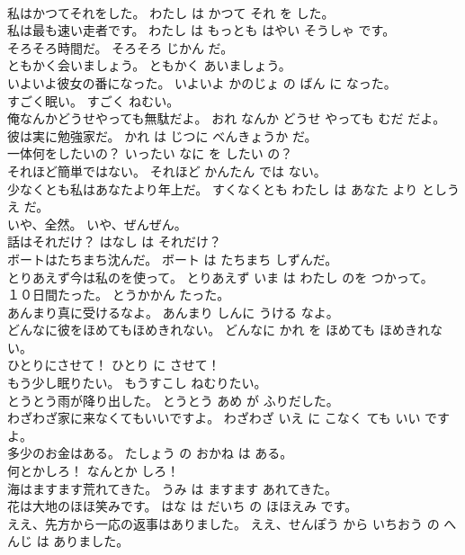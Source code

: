 \documentclass[8pt]{extreport}
\begin{document}
\begin{CJK}{UTF8}{min}
\\	私はかつてそれをした。	わたし は かつて それ を した。	
\\	私は最も速い走者です。	わたし は もっとも はやい そうしゃ です。	
\\	そろそろ時間だ。	そろそろ じかん だ。	
\\	ともかく会いましょう。	ともかく あいましょう。	
\\	いよいよ彼女の番になった。	いよいよ かのじょ の ばん に なった。	
\\	すごく眠い。	すごく ねむい。	
\\	俺なんかどうせやっても無駄だよ。	おれ なんか どうせ やっても むだ だよ。	
\\	彼は実に勉強家だ。	かれ は じつに べんきょうか だ。	
\\	一体何をしたいの？	いったい なに を したい の？	
\\	それほど簡単ではない。	それほど かんたん では ない。	
\\	少なくとも私はあなたより年上だ。	すくなくとも わたし は あなた より としうえ だ。	
\\	いや、全然。	いや、ぜんぜん。	
\\	話はそれだけ？	はなし は それだけ？	
\\	ボートはたちまち沈んだ。	ボート は たちまち しずんだ。	
\\	とりあえず今は私のを使って。	とりあえず いま は わたし のを つかって。	
\\	１０日間たった。	とうかかん たった。	
\\	あんまり真に受けるなよ。	あんまり しんに うける なよ。	
\\	どんなに彼をほめてもほめきれない。	どんなに かれ を ほめても ほめきれない。	
\\	ひとりにさせて！	ひとり に させて！	
\\	もう少し眠りたい。	もうすこし ねむりたい。	
\\	とうとう雨が降り出した。	とうとう あめ が ふりだした。	
\\	わざわざ家に来なくてもいいですよ。	わざわざ いえ に こなく ても いい です よ。	
\\	多少のお金はある。	たしょう の おかね は ある。	
\\	何とかしろ！	なんとか しろ！	
\\	海はますます荒れてきた。	うみ は ますます あれてきた。	
\\	花は大地のほほ笑みです。	はな は だいち の ほほえみ です。	
\\	ええ、先方から一応の返事はありました。	ええ、せんぽう から いちおう の へんじ は ありました。	

\end{CJK}
\end{document}
